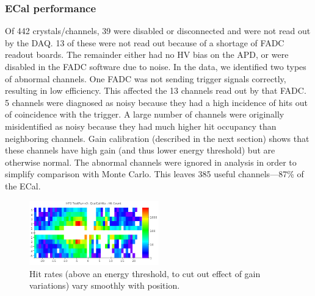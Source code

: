 
\subsubsection{ECal performance}


Of 442 crystals/channels, 39 were disabled or disconnected and were not read out by the DAQ. 
13 of these were not read out because of a shortage of FADC readout boards.
The remainder either had no HV bias on the APD, or were disabled in the FADC software due to noise.
In the data, we identified two types of abnormal channels. 
One FADC was not sending trigger signals correctly, resulting in low efficiency. This affected the 13 channels read out by that FADC.
5 channels were diagnosed as noisy because they had a high incidence of hits out of coincidence with the trigger.
A large number of channels were originally misidentified as noisy because they had much higher hit occupancy than neighboring channels.
Gain calibration (described in the next section) shows that these channels have high gain (and thus lower energy threshold) but are otherwise normal.
The abnormal channels were ignored in analysis in order to simplify comparison with Monte Carlo. This leaves 385 useful channels---87\% of the ECal.


\begin{figure}[ht]
	\includegraphics[width=0.5\textwidth]{test2012/ecalperformance/hitrates}
	\caption{\small{Hit rates (above an energy threshold, to cut out effect of gain variations) vary smoothly with position.}}
	\label{fig:hitrates}
\end{figure}

